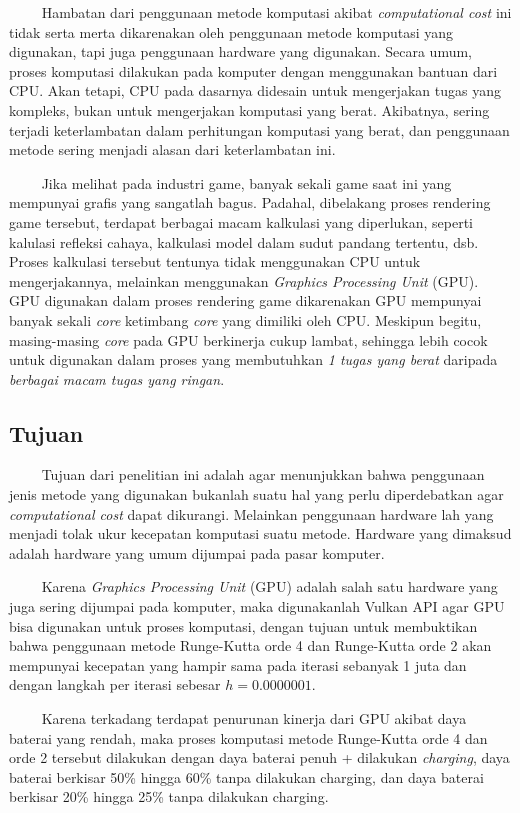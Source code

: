    Hambatan dari penggunaan metode komputasi akibat \emph{computational
cost} ini tidak serta merta dikarenakan oleh penggunaan metode komputasi
yang digunakan, tapi juga penggunaan hardware yang digunakan. Secara
umum, proses komputasi dilakukan pada komputer dengan menggunakan
bantuan dari CPU. Akan tetapi, CPU pada dasarnya didesain untuk
mengerjakan tugas yang kompleks, bukan untuk mengerjakan komputasi yang
berat. Akibatnya, sering terjadi keterlambatan dalam perhitungan
komputasi yang berat, dan penggunaan metode sering menjadi alasan dari
keterlambatan ini.

   Jika melihat pada industri game, banyak sekali game saat ini yang
mempunyai grafis yang sangatlah bagus. Padahal, dibelakang proses
rendering game tersebut, terdapat berbagai macam kalkulasi yang
diperlukan, seperti kalulasi refleksi cahaya, kalkulasi model dalam
sudut pandang tertentu, dsb. Proses kalkulasi tersebut tentunya tidak
menggunakan CPU untuk mengerjakannya, melainkan menggunakan
\emph{Graphics Processing Unit} (GPU). GPU digunakan dalam proses
rendering game dikarenakan GPU mempunyai banyak sekali \emph{core}
ketimbang \emph{core} yang dimiliki oleh CPU. Meskipun begitu,
masing-masing \emph{core} pada GPU berkinerja cukup lambat, sehingga
lebih cocok untuk digunakan dalam proses yang membutuhkan \emph{1 tugas
yang berat} daripada \emph{berbagai macam tugas yang ringan}.

\hypertarget{tujuan}{%
\subsection{Tujuan}\label{tujuan}}

   Tujuan dari penelitian ini adalah agar menunjukkan bahwa penggunaan
jenis metode yang digunakan bukanlah suatu hal yang perlu diperdebatkan
agar \emph{computational cost} dapat dikurangi. Melainkan penggunaan
hardware lah yang menjadi tolak ukur kecepatan komputasi suatu metode.
Hardware yang dimaksud adalah hardware yang umum dijumpai pada pasar
komputer.

   Karena \emph{Graphics Processing Unit} (GPU) adalah salah satu
hardware yang juga sering dijumpai pada komputer, maka digunakanlah
Vulkan API agar GPU bisa digunakan untuk proses komputasi, dengan tujuan
untuk membuktikan bahwa penggunaan metode Runge-Kutta orde 4 dan
Runge-Kutta orde 2 akan mempunyai kecepatan yang hampir sama pada
iterasi sebanyak 1 juta dan dengan langkah per iterasi sebesar
\(h = 0.0000001\).

   Karena terkadang terdapat penurunan kinerja dari GPU akibat daya
baterai yang rendah, maka proses komputasi metode Runge-Kutta orde 4 dan
orde 2 tersebut dilakukan dengan daya baterai penuh + dilakukan
\emph{charging}, daya baterai berkisar 50\% hingga 60\% tanpa dilakukan
charging, dan daya baterai berkisar 20\% hingga 25\% tanpa dilakukan
charging.

